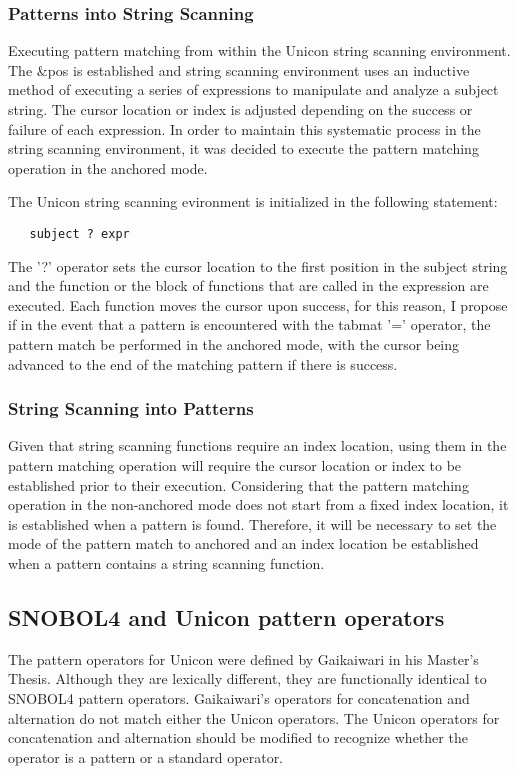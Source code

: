 \documentclass{article}
\begin{document}
\subsubsection{Patterns into String Scanning}
Executing pattern matching from within the Unicon string scanning environment.  The \&pos is established and string scanning environment uses an inductive method of executing a series of expressions to manipulate and analyze a subject string.  The cursor location or index is adjusted depending on the success or failure of each expression.  In order to maintain this systematic process in the string scanning environment, it was decided to execute the pattern matching operation in the anchored mode.  

The Unicon string scanning evironment is initialized in the following statement:

\begin{verbatim}
   subject ? expr
\end{verbatim}

The '?' operator sets the cursor location to the first position in the subject string and the function or the block of functions that are called in the expression are executed.  Each function moves the cursor upon success, for this reason, I propose if in the event that a pattern is encountered with the tabmat '=' operator, the pattern match be performed in the anchored mode, with the cursor being advanced to the end of the matching pattern if there is success.

\subsubsection{String Scanning into Patterns}
Given that string scanning functions require an index location, using them in the pattern matching operation will require the cursor location or index to be established prior to their execution.  Considering that the pattern matching operation in the non-anchored mode does not start from a fixed index location, it is established when a pattern is found.  Therefore, it will be necessary to set the mode of the pattern match to anchored and an index location be established when a pattern contains a string scanning function.

\subsection{SNOBOL4 and Unicon pattern operators}
The pattern operators for Unicon were defined by Gaikaiwari in his Master's Thesis.  Although they are lexically different, they are functionally identical to SNOBOL4 pattern operators.  Gaikaiwari's operators for concatenation and alternation do not match either the Unicon operators.  The Unicon operators for concatenation and alternation should be modified to recognize whether the operator is a pattern or a standard operator.
\end{document}

